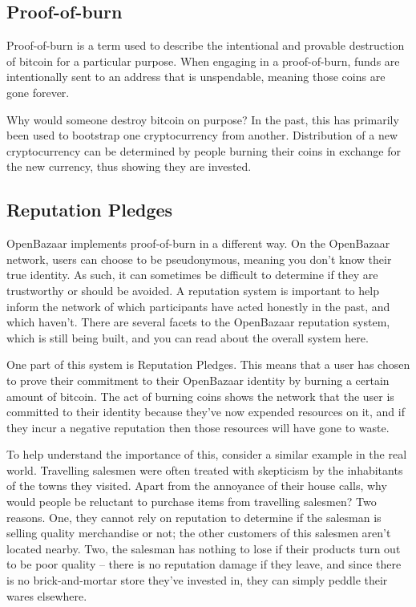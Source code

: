 \documentclass[journal]{IEEEtran}
\begin{document}
\subsection{Proof-of-burn}
Proof-of-burn is a term used to describe the intentional and provable destruction of bitcoin for a particular purpose. When engaging in a proof-of-burn, funds are intentionally sent to an address that is unspendable, meaning those coins are gone forever.

Why would someone destroy bitcoin on purpose? In the past, this has primarily been used to bootstrap one cryptocurrency from another. Distribution of a new cryptocurrency can be determined by people burning their coins in exchange for the new currency, thus showing they are invested. 

\subsection{Reputation Pledges}
OpenBazaar implements proof-of-burn in a different way. On the OpenBazaar network, users can choose to be pseudonymous, meaning you don’t know their true identity. As such, it can sometimes be difficult to determine if they are trustworthy or should be avoided. A reputation system is important to help inform the network of which participants have acted honestly in the past, and which haven’t. There are several facets to the OpenBazaar reputation system, which is still being built, and you can read about the overall system here.

One part of this system is Reputation Pledges. This means that a user has chosen to prove their commitment to their OpenBazaar identity by burning a certain amount of bitcoin. The act of burning coins shows the network that the user is committed to their identity because they’ve now expended resources on it, and if they incur a negative reputation then those resources will have gone to waste.

To help understand the importance of this, consider a similar example in the real world. Travelling salesmen were often treated with skepticism by the inhabitants of the towns they visited. Apart from the annoyance of their house calls, why would people be reluctant to purchase items from travelling salesmen? Two reasons. One, they cannot rely on reputation to determine if the salesman is selling quality merchandise or not; the other customers of this salesmen aren’t located nearby. Two, the salesman has nothing to lose if their products turn out to be poor quality – there is no reputation damage if they leave, and since there is no brick-and-mortar store they’ve invested in, they can simply peddle their wares elsewhere.
\end{document}
